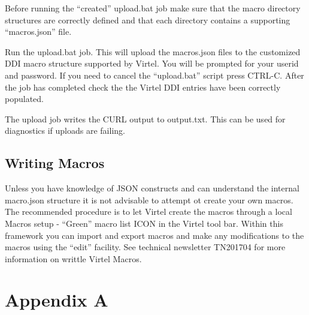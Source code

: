 \documentclass[letterpaper,10pt,english]{sphinxmanual}
\begin{document}
Before running the “created” upload.bat job make sure that the macro directory structures are correctly defined and that each directory contains a supporting “macros.json” file.

Run the upload.bat job. This will upload the macros.json files to the customized DDI macro structure supported by Virtel. You will be prompted for your userid and password. If you need to cancel the “upload.bat” script press CTRL-C. After the job has completed check the the Virtel DDI entries have been correctly populated.

The upload job writes the CURL output to output.txt. This can be used for diagnostics if uploads are failing.


\section{Writing Macros}
\label{\detokenize{TN201903:writing-macros}}
Unless you have knowledge of JSON constructs and can understand the internal macro.json structure it is not advisable to attempt ot create your own macros. The recommended procedure is to let Virtel create the macros through a local Macros setup - “Green” macro list ICON in the Virtel tool bar. Within this framework you can import and export macros and make any modifications to the macros using the “edit” facility. See technical newsletter TN201704 for more information on writtle Virtel Macros.

\newpage


\chapter{Appendix A}
\label{\detokenize{TN201903:appendix-a}}
\end{document}
